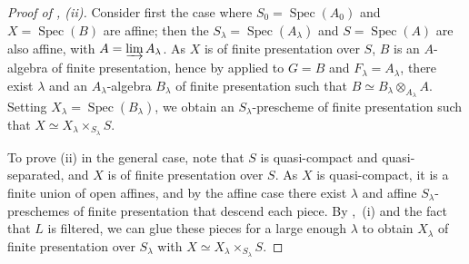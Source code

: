 \begin{proof}[Proof of , (ii)]
Consider first the case where $S_0=\operatorname{Spec}(A_0)$ and $X=\operatorname{Spec}(B)$ are affine; then the $S_\lambda=\operatorname{Spec}(A_\lambda)$ and $S=\operatorname{Spec}(A)$ are also affine, with $A=\varinjlim A_\lambda$.
As $X$ is of finite presentation over $S$, $B$ is an $A$-algebra of finite presentation, hence by  applied to $G=B$ and $F_\lambda=A_\lambda$, there exist $\lambda$ and an $A_\lambda$-algebra $B_\lambda$ of finite presentation such that $B\simeq B_\lambda\otimes_{A_\lambda}A$.
Setting $X_\lambda=\operatorname{Spec}(B_\lambda)$, we obtain an $S_\lambda$-prescheme of finite presentation such that $X\simeq X_\lambda\times_{S_\lambda}S$.

To prove (ii) in the general case, note that $S$ is quasi-compact and quasi-separated, and $X$ is of finite presentation over $S$.
As $X$ is quasi-compact, it is a finite union of open affines, and by the affine case there exist $\lambda$ and affine $S_\lambda$-preschemes of finite presentation that descend each piece.
By ,~(i) and the fact that $L$ is filtered, we can glue these pieces for a large enough $\lambda$ to obtain $X_\lambda$ of finite presentation over $S_\lambda$ with $X\simeq X_\lambda\times_{S_\lambda}S$.
\end{proof}

